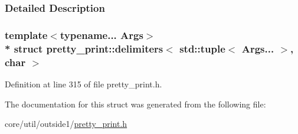 \subsubsection{Detailed Description}
\subsubsection*{template$<$typename... Args$>$\\*
struct pretty\+\_\+print\+::delimiters$<$ std\+::tuple$<$ Args... $>$, char $>$}



Definition at line 315 of file pretty\+\_\+print.\+h.



The documentation for this struct was generated from the following file\+:\begin{DoxyCompactItemize}
\item 
core/util/outside1/\hyperlink{pretty__print_8h}{pretty\+\_\+print.\+h}\end{DoxyCompactItemize}
